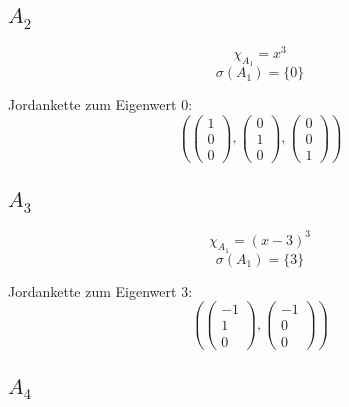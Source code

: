 \documentclass[10pt,a4paper]{article}
\begin{document}
\subsection*{$A_{2}$}

\begin{equation}
\chi_{A_{1}} = x^{3}
\end{equation}
\begin{equation}
\sigma(A_{1}) = \{0\}
\end{equation}

Jordankette zum Eigenwert $0$:
\begin{equation}
\left(
\begin{pmatrix}
1\\0\\0
\end{pmatrix},
\begin{pmatrix}
0\\1\\0
\end{pmatrix},
\begin{pmatrix}
0\\0\\1
\end{pmatrix}
\right)
\end{equation}

\subsection*{$A_{3}$}

\begin{equation}
\chi_{A_{1}} = (x - 3)^{3}
\end{equation}
\begin{equation}
\sigma(A_{1}) = \{3\}
\end{equation}

Jordankette zum Eigenwert $3$:
\begin{equation}
\left(
\begin{pmatrix}
-1\\1\\0
\end{pmatrix},
\begin{pmatrix}
-1\\0\\0
\end{pmatrix}
\right)
\end{equation}

\subsection*{$A_{4}$}
\end{document}
